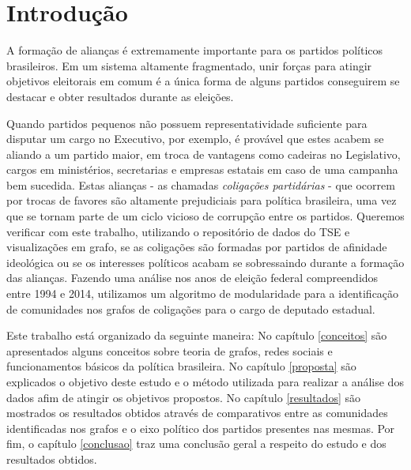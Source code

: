 \chapter{Introdu{\c   c}{\~a}o}
\label{introducao}
\setcounter{page}{6} %



\begin{comment}Por outro lado, existem também o cenário em que partidos pequenos são ideologicamente consistentes e se unem a partidos com ideais e objetivos em comum. \end{comment}

A formação de alianças é extremamente importante para os partidos políticos brasileiros. Em um sistema altamente fragmentado, unir forças para atingir objetivos eleitorais em comum é a única forma de alguns partidos conseguirem se destacar e obter resultados durante as eleições.

Quando partidos pequenos não possuem representatividade suficiente para disputar um cargo no Executivo, por exemplo, é provável que estes acabem se aliando a um partido maior, em troca de vantagens como cadeiras no Legislativo, cargos em ministérios, secretarias e empresas estatais em caso de uma campanha bem sucedida. Estas alianças - as chamadas \emph{coligações partidárias} - que ocorrem por trocas de favores são altamente prejudiciais para política brasileira, uma vez que se tornam parte de um ciclo vicioso de corrupção entre os partidos. Queremos verificar com este trabalho, utilizando o repositório de dados do TSE e visualizações em grafo, se as coligações são formadas por partidos de afinidade ideológica ou se os interesses políticos acabam se sobressaindo durante a formação das alianças. Fazendo uma análise nos anos de eleição federal compreendidos entre 1994 e 2014, utilizamos um algoritmo de modularidade para a identificação de comunidades nos grafos de coligações para o cargo de deputado estadual.

Este trabalho está organizado da seguinte maneira: No capítulo \ref{conceitos} são apresentados alguns conceitos  sobre teoria de grafos, redes sociais e funcionamentos básicos da política brasileira. No capítulo \ref{proposta} são explicados o objetivo deste estudo e o método utilizada para realizar a análise dos dados afim de atingir os objetivos propostos. No capítulo \ref{resultados} são mostrados os resultados obtidos através de comparativos entre as comunidades identificadas nos grafos e o eixo político dos partidos presentes nas mesmas. Por fim, o capítulo \ref{conclusao} traz uma conclusão geral a respeito do estudo e dos resultados obtidos.

